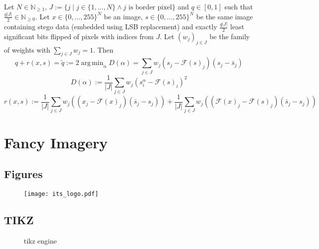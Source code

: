 \documentclass{itsarticle}
\DeclareMathOperator*{\argmin}{arg\,min}
\begin{document}
\begin{corollary}
    Let $N \in \mathbb{N}_{\ge 1}$, $J := \{j \mid j \in \{1, \dots, N\}
    \land j \text{ is border pixel}\}$ and $q \in \left[0, 1\right]$ such that
    $\frac{q |J|}{2} \in \mathbb{N}_{\ge 0}$. Let $x \in \{0, \dots, 255\}^N$
    be an image, $s \in \{0, \dots, 255\}^N$ be the same image containing stego
    data (embedded using LSB replacement) and exactly $\frac{q |J|}{2}$ least
    significant bits flipped of pixels with indices from $J$. Let $(w_j)_{j \in
    J}$ be the family of weights with $\sum\limits_{j \in J}w_j = 1$. Then
    \[
        q + r(x, s) = \tilde{q} := 2 \argmin_\alpha D(\alpha) = \sum\limits_{j \in J} w_j (s_j - \mathcal{F}(s)_j) (s_j - \bar{s}_j)
    \]
    \[
        D(\alpha) := \frac{1}{|J|} \sum\limits_{j \in J} w_j \left(s_i^\alpha - \mathcal{F}(s)_i\right)^2
    \]
    \[
        r(x, s) := \frac{1}{|J|} \sum\limits_{j \in J} w_j \left((x_j - \mathcal{F}(x)_j)(\bar{s}_j - s_j)\right) + \frac{1}{|J|} \sum\limits_{j \in J} w_j \left((\mathcal{F}(x)_j - \mathcal{F}(s)_j)(\bar{s}_j - s_j)\right)
    \]
\end{corollary}

\newpage

\section{Fancy Imagery}
\label{sec:fancy_imagery}

\subsection{Figures}
\label{sub:figures}

\begin{figure}[H]
    \centering
    \texttt{[image: its\_logo.pdf]}
    \label{fig:its_logo}
\end{figure}

\subsection{TIKZ}
\label{sub:tikz}

\begin{figure}[h]
    \centering
    
    \caption{tikz engine}
    \label{fig:tikz}
\end{figure}
\end{document}

